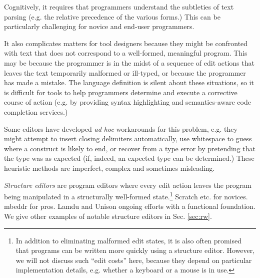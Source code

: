Cognitively, it requires that programmers understand the subtleties of text parsing (e.g. the relative precedence of the various forms.) This can be particularly challenging for novice and end-user programmers.

It also complicates matters for tool designers because they might be confronted with text that does not correspond to a well-formed, meaningful program. This may be because the programmer is in the midst of a sequence of 
edit actions that leaves the text temporarily malformed or ill-typed, or because the programmer has made a mistake. The language definition is silent about these situations, so it is difficult for tools to help programmers determine and execute a corrective course of action (e.g. by providing syntax highlighting and semantics-aware code completion services.)

Some editors have developed \emph{ad hoc} workarounds for this problem, e.g. they might attempt to insert closing delimiters automatically, use whitespace to guess where a construct is likely to end, or recover from a type error by pretending that the type was as expected (if, indeed, an expected type can be determined.) These heuristic methods are imperfect, complex and sometimes misleading.



\emph{Structure editors} are program editors where every edit action leaves the program being manipulated in a 
structurally well-formed state.\footnote{In addition to eliminating malformed edit states, it is also often promised that programs can be written more quickly using a structure editor. However, we will not discuss such ``edit costs'' here, because they depend on particular implementation details, e.g. whether a keyboard or a mouse is in use.} Scratch etc. for novices. mbeddr for pros. Lamdu and Unison ongoing efforts with a functional foundation. We give other examples of notable structure editors in Sec. \ref{sec:rw}.

